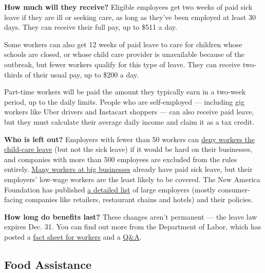 \textbf{How much will they receive?} Eligible employees get two weeks of
paid sick leave if they are ill or seeking care, as long as they've been
employed at least 30 days. They can receive their full pay, up to \$511
a day.

Some workers can also get 12 weeks of paid leave to care for children
whose schools are closed, or whose child care provider is unavailable
because of the outbreak, but fewer workers qualify for this type of
leave. They can receive two-thirds of their usual pay, up to \$200 a
day.

Part-time workers will be paid the amount they typically earn in a
two-week period, up to the daily limits. People who are self-employed
--- including gig workers like Uber drivers and Instacart shoppers ---
can also receive paid leave, but they must calculate their average daily
income and claim it as a tax credit.

\textbf{Who is left out?} Employers with fewer than 50 workers can
\href{https://www.nytimes3xbfgragh.onion/2020/04/02/us/politics/coronavirus-paid-leave.html}{deny
workers the child-care leave} (but not the sick leave) if it would be
hard on their businesses, and companies with more than 500 employees are
excluded from the rules entirely.
\href{https://www.bls.gov/ncs/ebs/benefits/2019/ownership/private/table31a.pdf}{Many
workers at big businesses} already have paid sick leave, but their
employers' low-wage workers are the least likely to be covered. The New
America Foundation has published
\href{https://www.newamerica.org/better-life-lab/reports/which-companies-still-arent-offering-paid-sick-days/}{a
detailed list} of large employers (mostly consumer-facing companies like
retailers, restaurant chains and hotels) and their policies.

\textbf{How long do benefits last?} These changes aren't permanent ---
the leave law expires Dec. 31. You can find out more from the Department
of Labor, which has posted a
\href{https://www.dol.gov/agencies/whd/pandemic/ffcra-employee-paid-leave}{fact
sheet for workers} and a
\href{https://www.dol.gov/agencies/whd/pandemic/ffcra-questions}{Q\&A}.

\hypertarget{food-assistance}{%
\subsection{Food Assistance}\label{food-assistance}}

